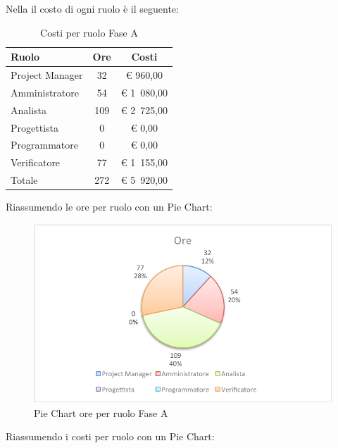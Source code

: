 				Nella  il costo di ogni ruolo è il seguente:
				\begin{table}[H]
					\begin{center}
						\begin{tabular}{| l | c | c |}
							\hline
							Ruolo 			& Ore 	& Costi  \\ \hline
							
							Project Manager	& 32 			& \euro{} 960,00 	\\
							Amministratore 		& 54 		& \euro{} 1~080,00 	\\
							Analista	 		& 109 		& \euro{} 2~725,00 	\\
							Progettista 		& 0			& \euro{} 0,00 	\\
							Programmatore		& 0			& \euro{} 0,00	\\
							Verificatore		& 77 		& \euro{} 1~155,00 	\\ \hline \hline
							
							Totale	 		& 272 	& \euro{} 5~920,00 	\\ \hline
						\end{tabular}
					\end{center}
					\caption{Costi per ruolo Fase A}
				\end{table}
				Riassumendo le ore per ruolo con un Pie Chart:
				\begin{figure}[H]\centering
					\includegraphics[width=\textwidth]{PianoDiProgetto/Pics/ChartTotOreFaseA.pdf}
					\caption{Pie Chart ore per ruolo Fase A}
				\end{figure}
				Riassumendo i costi per ruolo con un Pie Chart:
